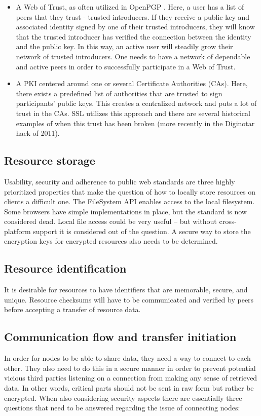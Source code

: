 \begin{itemize}
 \item A Web of Trust, as often utilized in OpenPGP \cite{Maurer:1996}. Here, a user has a list of peers that they trust - trusted introducers. If they receive a public key and associated identity signed by one of their trusted introducers, they will know that the trusted introducer has verified the connection between the identity and the public key. In this way, an active user will steadily grow their network of trusted introducers. One needs to have a network of dependable and active peers in order to successfully participate in a Web of Trust.

\item A PKI centered around one or several Certificate Authorities (CAs). Here, there exists a predefined list of authorities that are trusted to sign participants' public keys. This creates a centralized network and puts a lot of trust in the CAs. SSL utilizes this approach and there are several historical examples of when this trust has been broken (more recently in the Diginotar hack of 2011).
\end{itemize}

\subsection{Resource storage}
Usability, security and adherence to public web standards are three highly prioritized properties that make the question of how to locally store resources on clients a difficult one. The FileSystem API \cite{FileSystem:Online} enables access to the local filesystem. Some browsers have simple implementations in place, but the standard is now considered dead\cite{W3C:2014}. Local file access could be very useful – but without cross-platform support it is considered out of the question. A secure way to store the encryption keys for encrypted resources also needs to be determined.

\subsection{Resource identification}
It is desirable for resources to have identifiers that are memorable, secure, and unique. Resource checksums will have to be communicated and verified by peers before accepting a transfer of resource data.

\subsection{Communication flow and transfer initiation}
In order for nodes to be able to share data, they need a way to connect to each other. They also need to do this in a secure manner in order to prevent potential vicious third parties listening on a connection from making any sense of retrieved data. In other words, critical parts should not be sent in raw form but rather be encrypted. When also considering security aspects there are essentially three questions that need to be answered regarding the issue of connecting nodes:

